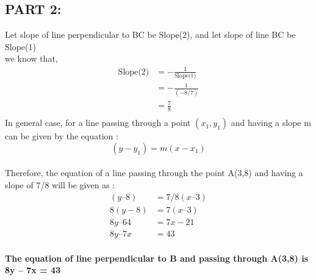 \documentclass[journal,12pt,twocolumn]{IEEEtran}
\begin{document}
     \subsection*{PART 2:}
     Let slope of line perpendicular to BC be Slope(2), and let slope of line BC be Slope(1)\\
     we know that,\\
     \begin{align*}
         \text{Slope(2)} &= -\frac{1}{\text{{Slope(1)}}}\\
         &=-\frac{\text{1}}{(-8/7)}\\
         &=\frac{7}{8}\\
     \end{align*}
     In general case, for a line passing through a point $(x_1,y_1)$ and having a slope m can be given by the equation :\\
     \begin{equation*}
         (y - y_1) = m ( x - x_1)
     \end{equation*}
     \medskip\\
     Therefore, the equation of a line passing through the point A(3,8) and having a slope of  7/8 will be given as :\\
     \begin{align*}
         ( y – 8 ) &= 7/8( x – 3 )\\
         8( y - 8 )&= 7(x – 3 )\\
         8y – 64 &= 7x - 21\\
         8y – 7x &= 43\\
     \end{align*}
     \begin{tcolorbox}
     \begin{center}
          \textbf{{The equation of line perpendicular to B and passing through A(3,8) is\\  8y – 7x = 43}}
     \end{center}
     \end{tcolorbox}
\end{document}
